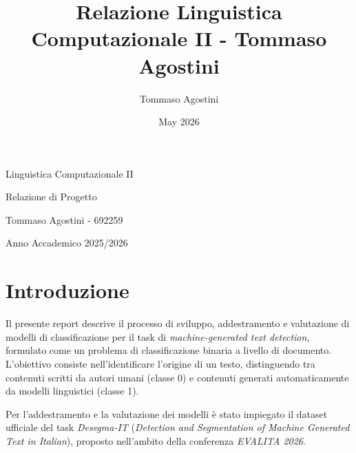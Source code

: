 \documentclass{article}
\title{Relazione Linguistica Computazionale II - Tommaso Agostini}
\author{Tommaso Agostini}
\date{May 2026}
\begin{document}
\begin{titlepage}
    \centering
    \vspace*{\fill}

    {\Huge Linguistica Computazionale II\par}
    \vspace{1cm}

    {\LARGE Relazione di Progetto\par}
    \vspace{2cm}

    {\Large Tommaso Agostini - 692259\par}
    \vspace{0.5cm}

    {\large Anno Accademico 2025/2026\par}

    \vspace*{\fill}
\end{titlepage}

\tableofcontents
\newpage

\section{Introduzione}
Il presente report descrive il processo di sviluppo, addestramento e valutazione di modelli di classificazione per il task di \textit{machine-generated text detection}, formulato come un problema di classificazione binaria a livello di documento. L'obiettivo consiste nell'identificare l'origine di un testo, distinguendo tra contenuti scritti da autori umani (classe 0) e contenuti generati automaticamente da modelli linguistici (classe 1).

Per l'addestramento e la valutazione dei modelli è stato impiegato il dataset ufficiale del task \textit{Desegma-IT} (\textit{Detection and Segmentation of Machine Generated Text in Italian}), proposto nell'ambito della conferenza \textit{EVALITA 2026}.
\end{document}
